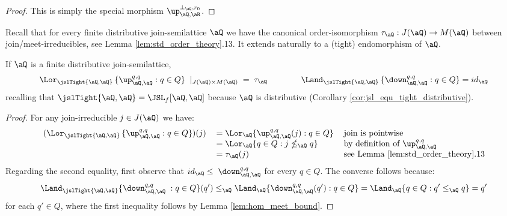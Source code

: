 \documentclass{article}
\begin{document}
\begin{proof}
This is simply the special morphism $\up_{\aQ,\aR}^{\bot_\aQ,r_0}$.
\end{proof}



Recall that for every finite distributive join-semilattice $\aQ$ we have the canonical order-isomorphism $\tau_\aQ : J(\aQ) \to M(\aQ)$ between join/meet-irreducibles, see Lemma \ref{lem:std_order_theory}.13. It extends naturally to a (tight) endomorphism of $\aQ$.

\smallskip


\begin{lemma}
\label{lem:spec_finite_distrib_endo_mor}
\item
If $\aQ$ is a finite distributive join-semilattice,
\[
\Lor_{\jslTight{\aQ,\aQ}} \, \{ \up_{\aQ,\aQ}^{q,q} : q \in Q \} \;\; |_{J(\aQ) \times M(\aQ)} \;=\; \tau_\aQ
\qquad\qquad
\Land_{\jslTight{\aQ,\aQ}} \, \{ \down_{\aQ,\aQ}^{q,q} : q \in Q \} = id_\aQ
\]
recalling that $\jslTight{\aQ,\aQ} = \JSL_f[\aQ,\aQ]$ because $\aQ$ is distributive (Corollary \ref{cor:jsl_equ_tight_distributive}).
\end{lemma}

\begin{proof}
For any join-irreducible $j \in J(\aQ)$ we have:
\[
\begin{tabular}{lll}
$(\Lor_{\jslTight{\aQ,\aQ}} \, \{ \up_{\aQ,\aQ}^{q,q} : q \in Q \})(j)$
&
$= \Lor_\aQ \{ \up_{\aQ,\aQ}^{q,q}(j) : q \in Q \}$
& join is pointwise
\\&
$= \Lor_\aQ \{ q \in Q : j \nleq_\aQ q \}$
& by definition of $\up_{\aQ,\aQ}^{q,q}$
\\&
$= \tau_\aQ(j)$
& see Lemma \ref{lem:std_order_theory}.13
\end{tabular}
\]
Regarding the second equality, first observe that $id_\aQ \leq \; \down_{\aQ,\aQ}^{q,q}$ for every $q \in Q$. The converse follows because:
\[
\Land_{\jslTight{\aQ,\aQ}} \{ \down_{\aQ,\aQ}^{q,q} \; : q \in Q \} (q') \leq_\aQ \Land_\aQ \{ \down_{\aQ,\aQ}^{q,q}(q') : q \in Q\}
= \Land_\aQ \{ q \in Q : q' \leq_\aQ q \}
= q'
\]
for each $q' \in Q$, where the first inequality follows by Lemma \ref{lem:hom_meet_bound}.
\end{proof}
\end{document}
